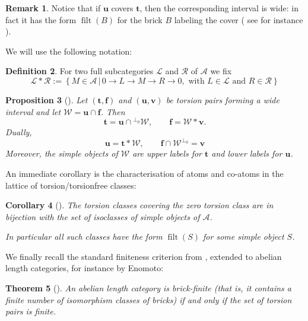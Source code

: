 \documentclass[11pt]{amsart}
\newtheorem{theorem}{Theorem}[section]
\newtheorem{proposition}[theorem]{Proposition}
\newtheorem{corollary}[theorem]{Corollary}
\theoremstyle{definition}
\newtheorem{definition}[theorem]{Definition}
\newtheorem{remark}[theorem]{Remark}
\newcommand{\A}{\mathcal A}
\newcommand{\filt}{\operatorname{filt}}
\begin{document}
\begin{remark}
Notice that if \( \mathbf{u} \) covers \( \mathbf{t} \), then the corresponding interval is wide: in fact it has the form \( \filt(B) \) for the brick \( B \) labeling the cover ( see for instance \cite[Theorem 3.3]{DIRRT} ).
\end{remark}

We will use the following notation:

\begin{definition}
For two full subcategories \( \mathcal{L} \) and \( \mathcal{R} \) of \( \A \) we fix
\[
\mathcal{L} * \mathcal{R} := \left\{ M \in \A \,|\,  0 \to L \to M \to R \to 0, \text{ with }L \in \mathcal{L}\text{ and }R \in \mathcal{R} \right\}
\]
\end{definition}

\begin{proposition}[{\cite[Theorem 4.2, Proposition 6.3]{AsaiPfeifer}}]\label{prop:cover-intersection}
Let \((\mathbf t,\mathbf f)\) and \((\mathbf u,\mathbf v)\) be torsion pairs forming a wide interval and let \( \mathcal{W} = \mathbf{u} \cap \mathbf{f} \). Then
\[
\mathbf{t} = \mathbf{u} \cap {}^{\perp_0} \mathcal{W},
\qquad
\mathbf f=\mathcal{W}*\mathbf v.
\]
Dually, 
\[
\mathbf {u} = \mathbf{t} * \mathcal{W}, \qquad \mathbf{f} \cap \mathcal{W}^{\perp_0} = \mathbf{v}
\]
Moreover, the simple objects of \( \mathcal{W} \) are upper labels for \( \mathbf{t} \) and lower labels for \( \mathbf{u} \).
\end{proposition}

An immediate corollary is the characterisation of atoms and co-atoms in the lattice of torsion/torsionfree classes:

\begin{corollary}[{\cite[Proposition 3.5]{AsaiPfeifer}}]
The torsion classes covering the zero torsion class are in bijection with the set of isoclasses of simple objects of \( \mathcal{A} \). 

In particular all such classes have the form \(\filt(S) \) for some simple object $ S $.
\end{corollary}

We finally recall the standard finiteness criterion from \cite{DIJ}, extended to abelian length categories, for instance by Enomoto:

\begin{theorem}[{\cite[Theorem 5.5]{EnomotoMonobrick}}]\label{thm:brick-finite-torsion-finite}
An abelian length category is brick-finite (that is, it contains a finite number of isomorphism classes of bricks) if and only if the set of torsion pairs is finite.
\end{theorem}
\end{document}
